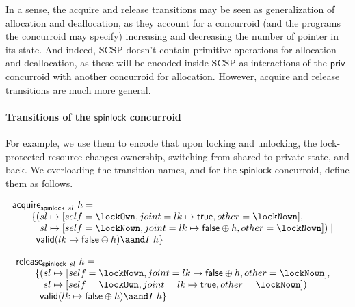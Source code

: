 In a sense, the acquire and release transitions may be seen as
generalization of allocation and deallocation, as they account for a
concurroid (and the programs the concurroid may specify) increasing
and decreasing the number of pointer in its state. And indeed, SCSP
doesn't contain primitive operations for allocation and deallocation,
as these will be encoded inside SCSP as interactions of the
$\mathsf{priv}$ concurroid with another concurroid for allocation.
However, acquire and release transitions are much more general. 

\paragraph{Transitions of the $\mathsf{spinlock}$ concurroid}

For example, we use them to encode that upon locking and unlocking,
the lock-protected resource changes ownership, switching from shared
to private state, and back. We overloading the transition names, and
for the $\mathsf{spinlock}$ concurroid, define them as follows.

\[
\begin{array}{l}
\mathsf{acquire}_{\mathsf{spinlock}\ sl}\ h = \\
\qquad \{
\!\!\!\begin{array}[t]{l}
 (\!\!\!\begin{array}[t]{l}
   sl \mapsto [self = \lockOwn, joint=lk \mapsto \mathsf{true}, other=\lockNown], \\\relax
   sl \mapsto [self = \lockNown, joint=lk \mapsto \mathsf{false} \oplus h, other=\lockNown]) \mid 
 \end{array}\\\relax
    \mathsf{valid} (lk \mapsto \mathsf{false} \oplus h) \aand I\ h\}
  \end{array}
\end{array}
\]

\[
\begin{array}{l}
\mathsf{release}_{\mathsf{spinlock}\ sl}\ h = \\
\qquad \{
\!\!\!\begin{array}[t]{l}
 (\!\!\!\begin{array}[t]{l}
   sl \mapsto [self = \lockNown, joint=lk \mapsto \mathsf{false} \oplus h, other=\lockNown], \\\relax
   sl \mapsto [self = \lockOwn, joint=lk \mapsto \mathsf{true}, other=\lockNown]) \mid 
 \end{array}\\\relax
    \mathsf{valid} (lk \mapsto \mathsf{false} \oplus h) \aand I\ h\}
  \end{array}
\end{array}
\]

